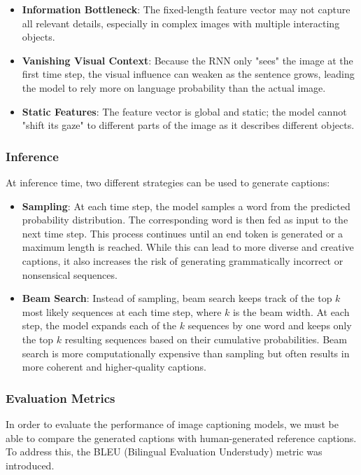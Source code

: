 \begin{itemize}
    \item \textbf{Information Bottleneck}: The fixed-length feature vector may not capture all relevant details, especially in complex images with multiple interacting objects.

    \item \textbf{Vanishing Visual Context}: Because the RNN only "sees" the image at the first time step, the visual influence can weaken as the sentence grows, leading the model to rely more on language probability than the actual image.

    \item \textbf{Static Features}: The feature vector is global and static; the model cannot "shift its gaze" to different parts of the image as it describes different objects.
\end{itemize}

\subsubsection{Inference}
At inference time, two different strategies can be used to generate captions:

\begin{itemize}

    \item \textbf{Sampling}: At each time step, the model samples a word from the predicted probability distribution.
    The corresponding word is then fed as input to the next time step. This process continues until an end token is generated or a maximum length is reached.
    While this can lead to more diverse and creative captions, it also increases the risk of generating grammatically incorrect or nonsensical sequences.

    \item \textbf{Beam Search}: Instead of sampling, beam search keeps track of the top $k$ most likely sequences at each time step,
    where $k$ is the beam width. At each step, the model expands each of the $k$ sequences by one word and keeps only the top $k$ resulting sequences based on their cumulative probabilities.
    Beam search is more computationally expensive than sampling but often results in more coherent and higher-quality captions.
\end{itemize}

\subsubsection{Evaluation Metrics}
In order to evaluate the performance of image captioning models, we must be able to compare the generated captions with
human-generated reference captions. To address this, the BLEU (Bilingual Evaluation Understudy) metric was introduced.


